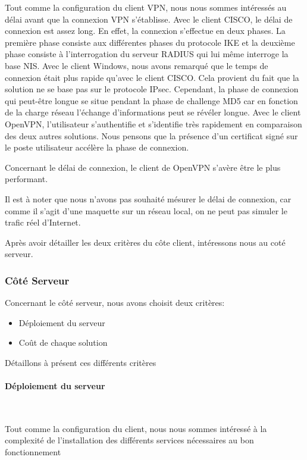 Tout comme la configuration du client VPN, nous nous sommes intéressés au délai avant que la connexion VPN s'établisse.
Avec le client CISCO, le délai de connexion est assez long. En effet, la connexion s'effectue en deux phases. La première phase consiste aux différentes phases du protocole IKE et la deuxième phase consiste à l'interrogation du serveur RADIUS qui lui même interroge la base NIS. 
Avec le client Windows, nous avons remarqué que le temps de connexion était plus rapide qu'avec le client CISCO. Cela provient du fait que la solution ne se base pas sur le protocole IPsec. Cependant, la phase de connexion qui peut-être longue se situe pendant la phase de challenge MD5 car en fonction de la charge réseau l'échange d'informations peut se révéler longue.
Avec le client OpenVPN, l'utilisateur s'authentifie et s'identifie très rapidement en comparaison des deux autres solutions. Nous pensons que la présence d'un certificat signé sur le poste utilisateur accélère la phase de connexion.

Concernant le délai de connexion, le client de OpenVPN s'avère être le plus performant.

Il est à noter que nous n'avons pas souhaité mésurer le délai de connexion, car comme il s'agit d'une maquette sur un réseau local, on ne peut pas simuler le trafic réel d'Internet.

Après avoir détailler les deux critères du côte client, intéressons nous au coté serveur.



\subsubsection{Côté Serveur}

Concernant le côté serveur, nous avons choisit deux critères:
\begin{itemize}
 	\item Déploiement du serveur
	\item Coût de chaque solution 
\end{itemize}

Détaillons à présent ces différents critères

\paragraph{Déploiement du serveur}
~\


Tout comme la configuration du client, nous nous sommes intéressé à la complexité de l'installation des différents services nécessaires au bon fonctionnement 

